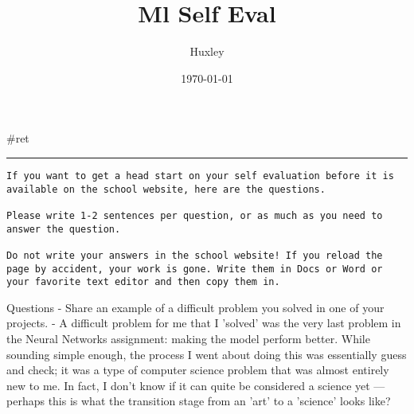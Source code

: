 \documentclass[letterpaper]{article}
\author{Huxley}
\date{\today}
\title{Ml Self Eval}
\renewcommand{\tableofcontents}{}
\begin{document}
\tableofcontents

\#ret

\noindent\rule{\textwidth}{0.5pt}

\begin{verbatim}
If you want to get a head start on your self evaluation before it is available on the school website, here are the questions.

Please write 1-2 sentences per question, or as much as you need to answer the question.

Do not write your answers in the school website! If you reload the page by accident, your work is gone. Write them in Docs or Word or your favorite text editor and then copy them in.
\end{verbatim}

Questions - Share an example of a difficult problem you solved in one of
your projects. - A difficult problem for me that I 'solved' was the very
last problem in the Neural Networks assignment: making the model perform
better. While sounding simple enough, the process I went about doing
this was essentially guess and check; it was a type of computer science
problem that was almost entirely new to me. In fact, I don't know if it
can quite be considered a science yet --- perhaps this is what the
transition stage from an 'art' to a 'science' looks like?
\end{document}
